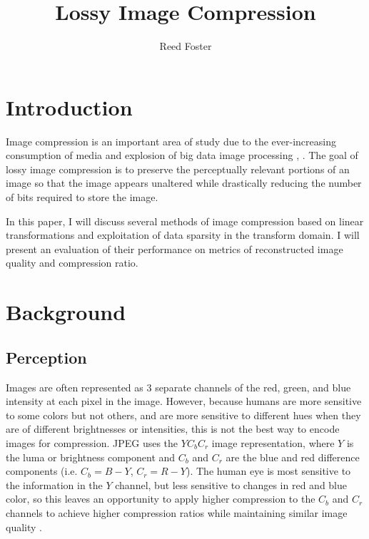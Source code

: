\documentclass[conference]{IEEEtran}
\begin{document}
\title{Lossy Image Compression}

\author{Reed Foster}

\maketitle

%

\section{Introduction}

Image compression is an important area of study due to the ever-increasing consumption of media and explosion of big data image processing \cite{imgProcessingTinkuAcharya}, \cite{scnn}.
The goal of lossy image compression is to preserve the perceptually relevant portions of an image so that the image appears unaltered while drastically reducing the number of bits required to store the image.

In this paper, I will discuss several methods of image compression based on linear transformations and exploitation of data sparsity in the transform domain.
I will present an evaluation of their performance on metrics of reconstructed image quality and compression ratio.

\section{Background}

\subsection{Perception}
Images are often represented as 3 separate channels of the red, green, and blue intensity at each pixel in the image.
However, because humans are more sensitive to some colors but not others, and are more sensitive to different hues when they are of different brightnesses or intensities, this is not the best way to encode images for compression.
JPEG uses the $YC_bC_r$ image representation, where $Y$ is the luma or brightness component and $C_b$ and $C_r$ are the blue and red difference components (i.e. $C_b = B - Y$, $C_r = R - Y$).
The human eye is most sensitive to the information in the $Y$ channel, but less sensitive to changes in red and blue color, so this leaves an opportunity to apply higher compression to the $C_b$ and $C_r$ channels to achieve higher compression ratios while maintaining similar image quality \cite{hvsYcbcr}.
\end{document}
